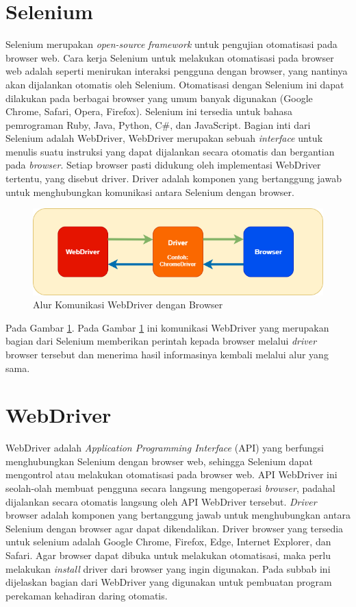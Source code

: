 \section{Selenium}
\label{sec:selenium}
Selenium merupakan \textit{open-source} \textit{framework} untuk pengujian otomatisasi pada browser web\cite{selenium}. Cara kerja Selenium untuk melakukan otomatisasi pada browser web adalah seperti menirukan interaksi pengguna dengan browser, yang nantinya akan dijalankan otomatis oleh Selenium. Otomatisasi dengan Selenium ini dapat dilakukan pada berbagai browser yang umum banyak digunakan (Google Chrome, Safari, Opera, Firefox). Selenium ini tersedia untuk bahasa pemrograman Ruby, Java, Python, C\#, dan JavaScript. Bagian inti dari Selenium adalah WebDriver, WebDriver merupakan sebuah \textit{interface} untuk menulis suatu instruksi yang dapat dijalankan secara otomatis dan bergantian pada \textit{browser}. Setiap browser pasti didukung oleh implementasi WebDriver tertentu, yang disebut driver. Driver adalah komponen yang bertanggung jawab untuk menghubungkan komunikasi antara Selenium dengan browser. 
\begin{figure}[H]
	\centering
	\includegraphics[scale=0.7]{Gambar/flowSelenium.png}
	\caption{Alur Komunikasi WebDriver dengan Browser} 
	\label{fig:flowSelenium}
\end{figure}
Pada Gambar \ref{fig:flowSelenium}. Pada Gambar \ref{fig:flowSelenium} ini komunikasi WebDriver yang merupakan bagian dari Selenium memberikan perintah kepada browser melalui \textit{driver} browser tersebut dan menerima hasil informasinya kembali melalui alur yang sama.

\section{WebDriver}
\label{sec:webdriver}
WebDriver adalah \textit{Application Programming Interface} (API) yang berfungsi menghubungkan Selenium dengan browser web, sehingga Selenium dapat mengontrol atau melakukan otomatisasi pada browser web\cite{selenium}. API WebDriver ini seolah-olah membuat pengguna secara langsung mengoperasi \textit{browser}, padahal dijalankan secara otomatis langsung oleh API WebDriver tersebut. 
\textit{Driver} browser adalah komponen yang bertanggung jawab untuk menghubungkan antara Selenium dengan browser agar dapat dikendalikan. Driver browser yang tersedia untuk selenium adalah Google Chrome, Firefox, Edge, Internet Explorer, dan Safari. Agar browser dapat dibuka untuk melakukan otomatisasi, maka perlu melakukan \textit{install} driver dari browser yang ingin digunakan. Pada subbab ini dijelaskan bagian dari WebDriver yang digunakan untuk pembuatan program perekaman kehadiran daring otomatis.

